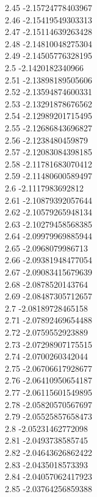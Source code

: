 {2.45	-2.15724778403967\\
2.46	-2.15419549303313\\
2.47	-2.15114639263428\\
2.48	-2.14810048275304\\
2.49	-2.14505776328195\\
2.5	-2.1420182340966\\
2.51	-2.13898189505606\\
2.52	-2.13594874600331\\
2.53	-2.13291878676562\\
2.54	-2.12989201715495\\
2.55	-2.12686843696827\\
2.56	-2.1238480459879\\
2.57	-2.12083084398185\\
2.58	-2.11781683070412\\
2.59	-2.11480600589497\\
2.6	-2.1117983692812\\
2.61	-2.10879392057644\\
2.62	-2.10579265948134\\
2.63	-2.10279458568385\\
2.64	-2.09979969885944\\
2.65	-2.0968079986713\\
2.66	-2.09381948477054\\
2.67	-2.09083415679639\\
2.68	-2.0878520143764\\
2.69	-2.08487305712657\\
2.7	-2.08189728465158\\
2.71	-2.07892469654488\\
2.72	-2.0759552923889\\
2.73	-2.07298907175515\\
2.74	-2.0700260342044\\
2.75	-2.06706617928677\\
2.76	-2.06410950654187\\
2.77	-2.06115601549895\\
2.78	-2.05820570567697\\
2.79	-2.05525857658473\\
2.8	-2.05231462772098\\
2.81	-2.0493738585745\\
2.82	-2.04643626862422\\
2.83	-2.0435018573393\\
2.84	-2.04057062417923\\
2.85	-2.03764256859388\\
}
